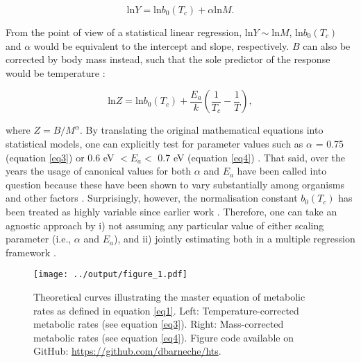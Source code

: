\documentclass[a4paper,12pt]{article}
\begin{document}
\begin{equation}
  \textrm{ln}Y = \textrm{ln}b_0(T_c) + \alpha \textrm{ln}M.
  \label{eq3}
\end{equation}

From the point of view of a statistical linear regression, $\textrm{ln}Y \sim \textrm{ln}M$, $\textrm{ln}b_0(T_c)$ and $\alpha$ would be equivalent to the intercept and slope, respectively. $B$ can also be corrected by body mass instead, such that the sole predictor of the response would be temperature \citep[Figure \ref{fig1}, right;][]{brown2004ecology, savage2004amnat}:

\begin{equation}
  \textrm{ln}Z = \textrm{ln}b_0(T_c) + \frac{E_a}{k}\left(\frac{1}{T_c} - \frac{1}{T}\right),
  \label{eq4}
\end{equation}

where $Z = B / M^\alpha$. By translating the original mathematical equations into statistical models, one can explicitly test for parameter values such as $\alpha$ = 0.75 (equation \ref{eq3}) or 0.6 eV $< E_a <$ 0.7 eV (equation \ref{eq4}) \citep{west1997science, gillooly2001science, brown2004ecology}. That said, over the years the usage of canonical values for both $\alpha$ and $E_a$ have been called into question because these have been shown to vary substantially among organisms and other factors \citep{makarieva2005functecol, glazier2005biolrev, moses2008amnat, glazier2010biolrev, pawar2016amnat, barton2019limn, white2003pnas, white2005jeb, delong2010pnas}. Surprisingly, however, the normalisation constant $b_0(T_c)$ has been treated as highly variable since earlier work \citep{brown2004ecology}. Therefore, one can take an agnostic approach by i) not assuming any particular value of either scaling parameter (i.e., $\alpha$ and $E_a$), and ii) jointly estimating both in a multiple regression framework \citep[i.e., using equations \ref{eq1}--\ref{eqSS};][]{barneche2014ele}.

\bigskip
\bigskip

\begin{figure}[!ht]
  \begin{center}
    \texttt{[image: ../output/figure\_1.pdf]}
  \end{center}
  \caption{Theoretical curves illustrating the master equation of metabolic rates as defined in equation \ref{eq1}. Left: Temperature-corrected metabolic rates (see equation \ref{eq3}). Right: Mass-corrected metabolic rates (see equation \ref{eq4}). Figure code available on GitHub: \url{https://github.com/dbarneche/hts}.}
  \label{fig1}
\end{figure}
\end{document}
